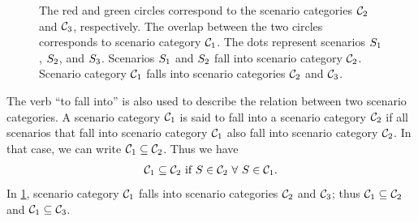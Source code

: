 \setlength{\venncircle}{7em}
\begin{figure}
	\centering
	
	\caption{\cbstartc The red and green circles correspond to the scenario categories $\mathcal{C}_{2}$ and $\mathcal{C}_{3}$, respectively. The overlap between the two circles corresponds to scenario category $\mathcal{C}_{1}$. The dots represent scenarios $S_{1}$, $S_{2}$, and $S_{3}$. Scenarios $S_{1}$ and $S_{2}$ fall into scenario category $\mathcal{C}_{2}$. Scenario category $\mathcal{C}_{1}$ falls into scenario categories $\mathcal{C}_{2}$ and $\mathcal{C}_{3}$.\cbend}
	\label{fig:venn diagram scenario category}
\end{figure}

The verb ``to fall into'' is also used to describe the relation between two scenario categories. A scenario category $\mathcal{C}_{1}$ is said to fall into a scenario category $\mathcal{C}_{2}$ if all scenarios that fall into scenario category $\mathcal{C}_{1}$ also fall into scenario category $\mathcal{C}_{2}$. In that case, we can write $\mathcal{C}_{1} \subseteq \mathcal{C}_{2}$. Thus we have
\begin{equation} \label{eq:fall into scenario category}
	\mathcal{C}_{1} \subseteq \mathcal{C}_{2} \text{ if } S \in \mathcal{C}_{2} \,\,\forall\,\, S \in \mathcal{C}_{1}.
\end{equation}
\cbstartc
In \cref{fig:venn diagram scenario category}, scenario category $\mathcal{C}_{1}$ falls into scenario categories $\mathcal{C}_{2}$ and $\mathcal{C}_{3}$; thus $\mathcal{C}_{1} \subseteq \mathcal{C}_{2}$ and $\mathcal{C}_{1} \subseteq \mathcal{C}_{3}$.
\cbend

